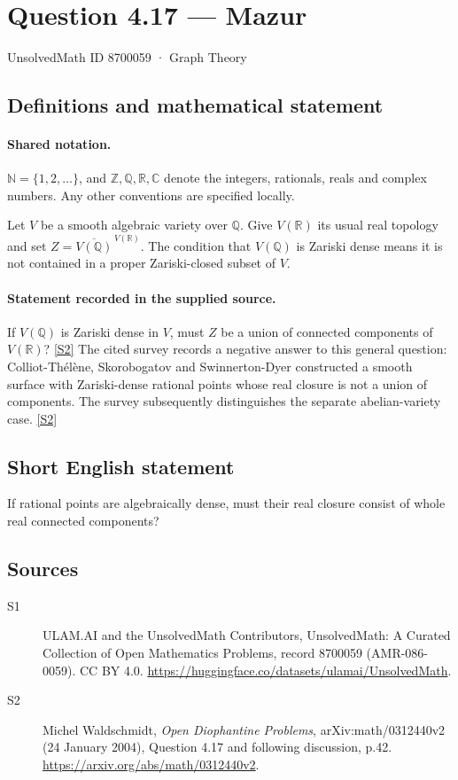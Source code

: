 \documentclass[11pt]{article}
\newcommand{\sref}[2]{\hyperlink{source:#1:#2}{[S#2]}}
\begin{document}
\setcounter{section}{8700058}
\section{Question 4.17 — Mazur}\label{8700059}
{\small\sffamily UnsolvedMath ID 8700059 · Graph Theory}
\subsection{Definitions and mathematical statement}

\paragraph{Shared notation.}$\mathbb N=\{1,2,\ldots\}$, and $\mathbb Z,\mathbb Q,\mathbb R,\mathbb C$ denote the integers, rationals, reals and complex numbers. Any other conventions are specified locally.


Let $V$ be a smooth algebraic variety over $\mathbb Q$. Give $V(\mathbb R)$ its usual real topology and set $Z=\overline{V(\mathbb Q)}^{\,V(\mathbb R)}$. The condition that $V(\mathbb Q)$ is Zariski dense means it is not contained in a proper Zariski-closed subset of $V$.
\paragraph{Statement recorded in the supplied source.}
If $V(\mathbb Q)$ is Zariski dense in $V$, must $Z$ be a union of connected components of $V(\mathbb R)$? \sref{8700059}{2}
The cited survey records a negative answer to this general question: Colliot-Thélène, Skorobogatov and Swinnerton-Dyer constructed a smooth surface with Zariski-dense rational points whose real closure is not a union of components. The survey subsequently distinguishes the separate abelian-variety case. \sref{8700059}{2}
\subsection{Short English statement}
If rational points are algebraically dense, must their real closure consist of whole real connected components?
\subsection{Sources}
\begin{description}
\item[\hypertarget{source:8700059:1}{S1}] ULAM.AI and the UnsolvedMath Contributors, UnsolvedMath: A Curated Collection of Open Mathematics Problems, record 8700059 (AMR-086-0059). CC BY 4.0. \url{https://huggingface.co/datasets/ulamai/UnsolvedMath}.
\item[\hypertarget{source:8700059:2}{S2}] Michel Waldschmidt, \emph{Open Diophantine Problems}, arXiv:math/0312440v2 (24 January 2004), Question 4.17 and following discussion, p.42. \url{https://arxiv.org/abs/math/0312440v2}.
\end{description}
\label{end:8700059}
\end{document}

